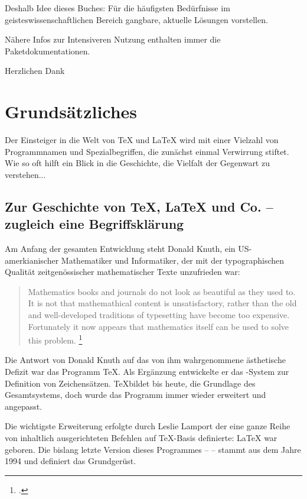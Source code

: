 \documentclass[%
   fontsize=11pt,%
   paper=17cm:24cm,%
   DIV=13,%
   pagesize%
   ]{scrbook}  	%
\newcommand{\METAFONT}{\hologo{METAFONT}}
\begin{document}
Deshalb Idee dieses Buches: Für die häufigsten Bedürfnisse im geisteswissenschaftlichen
Bereich gangbare, aktuelle Lösungen vorstellen.

Nähere Infos zur Intensiveren Nutzung enthalten immer die Paketdokumentationen.

Herzlichen Dank 

\tableofcontents

\chapter{Grundsätzliches}

Der Einsteiger in die Welt von \TeX{} und \LaTeX{} wird mit einer Vielzahl von Programmnamen und 
Spezialbegriffen, die zunächst einmal Verwirrung stiftet. 
Wie so oft hilft ein Blick in die Geschichte, die Vielfalt der Gegenwart zu verstehen...


\section{Zur Geschichte von \TeX{}, \LaTeX{} und Co. -- zugleich eine Begriffsklärung}

Am Anfang der gesamten Entwicklung steht Donald Knuth, ein US-amerkianischer Mathematiker und 
Informatiker, der mit der typographischen Qualität zeitgenössischer mathematischer Texte 
unzufrieden war:

\begin{quote}
 Mathematics books and journals do not look as beautiful as they used to.
 It is not that mathemathical content is unsatisfactory, rather than the old and 
 well-developed traditions of typesetting have become too expensive.
 Fortunately it now appears that mathematics itself can be used to solve this problem.%
 \footcite[Zitiert nach: ][S. 1]{voss:einfuehrung}
\end{quote}

Die Antwort von Donald Knuth auf das von ihm wahrgenommene ästhetische Defizit war das  
Programm \TeX. Als Ergänzung entwickelte er das \METAFONT-System zur Definition von 
Zeichensätzen.
\TeX bildet bis heute, die Grundlage des Gesamtsystems, doch wurde das Programm immer 
wieder erweitert und angepasst.

Die wichtigste Erweiterung erfolgte durch Leslie Lamport der eine ganze Reihe von 
inhaltlich ausgerichteten Befehlen auf \TeX-Basis definierte: \LaTeX{} war geboren.
Die bislang letzte Version dieses Programmes -- \LaTeXe{} -- stammt aus dem Jahre 1994
und definiert das Grundgerüst.
\end{document}
